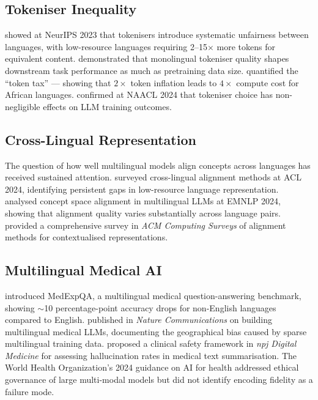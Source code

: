 \documentclass[11pt,a4paper]{article}
\begin{document}
\subsection{Tokeniser Inequality}

\citet{petrov2023} showed at NeurIPS 2023 that tokenisers introduce systematic unfairness between languages, with low-resource languages requiring 2--15$\times$ more tokens for equivalent content. \citet{rust2021} demonstrated that monolingual tokeniser quality shapes downstream task performance as much as pretraining data size. \citet{lundin2025} quantified the ``token tax'' --- showing that $2\times$ token inflation leads to $4\times$ compute cost for African languages. \citet{ali2024} confirmed at NAACL 2024 that tokeniser choice has non-negligible effects on LLM training outcomes.

\subsection{Cross-Lingual Representation}

The question of how well multilingual models align concepts across languages has received sustained attention. \citet{hammerl2024} surveyed cross-lingual alignment methods at ACL 2024, identifying persistent gaps in low-resource language representation. \citet{peng2024} analysed concept space alignment in multilingual LLMs at EMNLP 2024, showing that alignment quality varies substantially across language pairs. \citet{pallucchini2025} provided a comprehensive survey in \emph{ACM Computing Surveys} of alignment methods for contextualised representations.

\subsection{Multilingual Medical AI}

\citet{alonso2024} introduced MedExpQA, a multilingual medical question-answering benchmark, showing $\sim$10 percentage-point accuracy drops for non-English languages compared to English. \citet{qiu2024} published in \emph{Nature Communications} on building multilingual medical LLMs, documenting the geographical bias caused by sparse multilingual training data. \citet{asgari2025} proposed a clinical safety framework in \emph{npj Digital Medicine} for assessing hallucination rates in medical text summarisation. The World Health Organization's 2024 guidance on AI for health \citep{who2024} addressed ethical governance of large multi-modal models but did not identify encoding fidelity as a failure mode.
\end{document}
